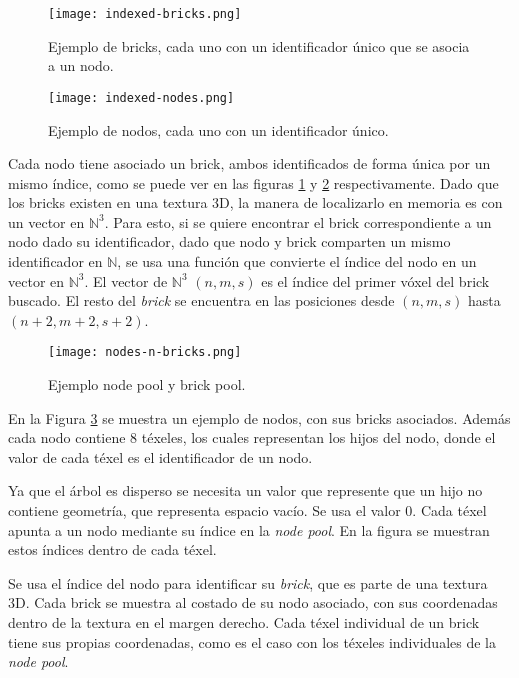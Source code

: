 \begin{figure}[h!]
    \centering
    \texttt{[image: indexed-bricks.png]}
    \caption{Ejemplo de bricks, cada uno con un identificador único que se asocia a un nodo.}
    \label{fig:indexed_bricks}
\end{figure}

\begin{figure}[h!]
    \centering
    \texttt{[image: indexed-nodes.png]}
    \caption{Ejemplo de nodos, cada uno con un identificador único.}
    \label{fig:indexed_nodes}
\end{figure}

Cada nodo tiene asociado un brick, ambos identificados de forma única por un mismo índice, como se puede ver en las figuras \ref{fig:indexed_bricks} y \ref{fig:indexed_nodes} respectivamente.
Dado que los bricks existen en una textura 3D, la manera de localizarlo en memoria es con un vector en $\mathbb{N}^3$.
Para esto, si se quiere encontrar el brick correspondiente a un nodo dado su identificador, dado que nodo y brick comparten un mismo identificador en $\mathbb{N}$, se usa una función que convierte el índice del nodo en un vector en $\mathbb{N}^3$.
El vector de $\mathbb{N}^3$ $(n, m, s)$ es el índice del primer vóxel del brick buscado.
El resto del \textit{brick} se encuentra en las posiciones desde $(n, m, s)$ hasta $(n + 2, m + 2, s + 2)$.

\begin{figure}[h!]
    \centering
    \texttt{[image: nodes-n-bricks.png]}
    \caption{Ejemplo node pool y brick pool.}
    \label{fig:nodes_n_bricks}
\end{figure}

En la Figura \ref{fig:nodes_n_bricks} se muestra un ejemplo de nodos, con sus bricks asociados.
Además cada nodo contiene $8$ téxeles, los cuales representan los hijos del nodo, donde el valor de cada téxel es el identificador de un nodo.

Ya que el árbol es disperso se necesita un valor que represente que un hijo no contiene geometría, que representa espacio vacío.
Se usa el valor 0.
Cada téxel apunta a un nodo mediante su índice en la \textit{node pool}.
En la figura se muestran estos índices dentro de cada téxel.

Se usa el índice del nodo para identificar su \textit{brick}, que es parte de una textura 3D.
Cada brick se muestra al costado de su nodo asociado, con sus coordenadas dentro de la textura en el margen derecho.
Cada téxel individual de un brick tiene sus propias coordenadas, como es el caso con los téxeles individuales de la \textit{node pool}.

